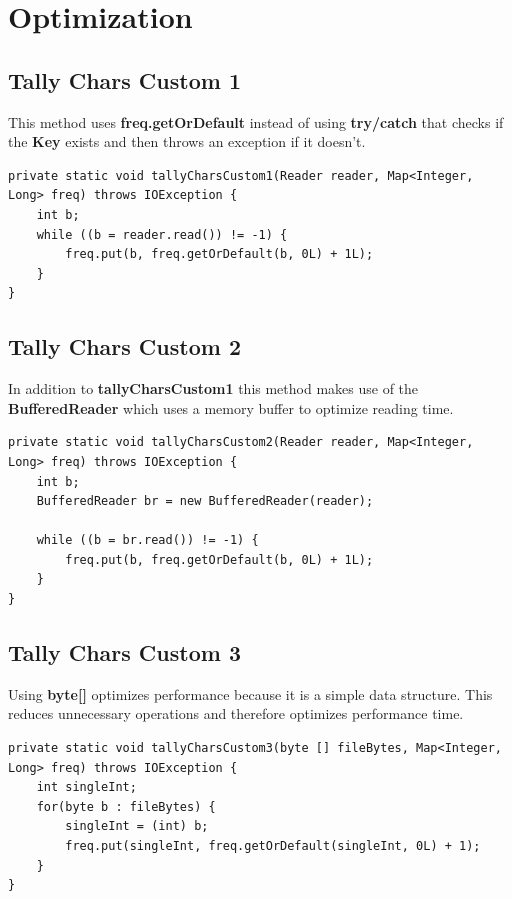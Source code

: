 \documentclass[a4paper,11pt]{article}
\theoremstyle{mytheor}
\begin{document}
\section*{Optimization}

\subsection*{Tally Chars Custom 1}

This method uses \textbf{freq.getOrDefault} instead of using \textbf{try/catch} that checks if the \textbf{Key} exists and then throws an exception if it doesn't.

\begin{lstlisting}[label={list:second}]
private static void tallyCharsCustom1(Reader reader, Map<Integer, Long> freq) throws IOException {
    int b;
    while ((b = reader.read()) != -1) {
        freq.put(b, freq.getOrDefault(b, 0L) + 1L);
    }
}
\end{lstlisting}

\subsection*{Tally Chars Custom 2}

In addition to \textbf{tallyCharsCustom1} this method makes use of the \textbf{BufferedReader} which uses a memory buffer to optimize reading time.

\begin{lstlisting}[label={list:third}]
private static void tallyCharsCustom2(Reader reader, Map<Integer, Long> freq) throws IOException {
    int b;
    BufferedReader br = new BufferedReader(reader);

    while ((b = br.read()) != -1) {
        freq.put(b, freq.getOrDefault(b, 0L) + 1L);
    }
}
\end{lstlisting}

\newpage 
\subsection*{Tally Chars Custom 3}

Using \textbf{byte[]} optimizes performance because it is a simple data structure. This reduces unnecessary operations and therefore optimizes performance time.

\begin{lstlisting}[label={list:third}]
private static void tallyCharsCustom3(byte [] fileBytes, Map<Integer, Long> freq) throws IOException {
    int singleInt;
    for(byte b : fileBytes) {
        singleInt = (int) b;
        freq.put(singleInt, freq.getOrDefault(singleInt, 0L) + 1);
    }
}
\end{lstlisting}
\end{document}
